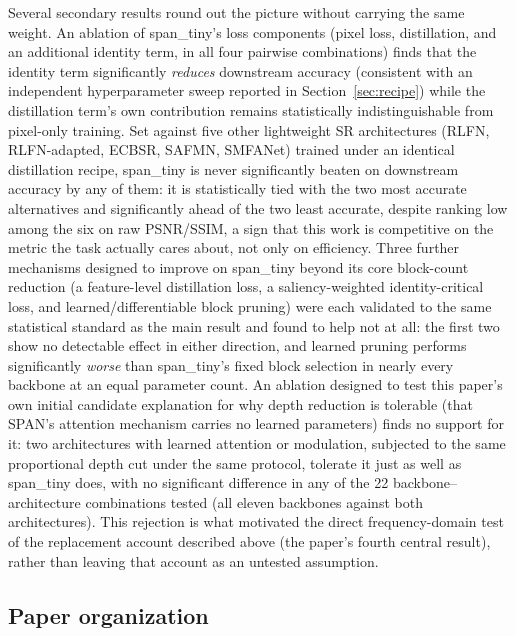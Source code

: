 \documentclass[11pt]{article}
\begin{document}
Several secondary results round out the picture without carrying the same weight. An ablation of span\_tiny's loss components (pixel loss, distillation, and an additional identity term, in all four pairwise combinations) finds that the identity term significantly \emph{reduces} downstream accuracy (consistent with an independent hyperparameter sweep reported in Section~\ref{sec:recipe}) while the distillation term's own contribution remains statistically indistinguishable from pixel-only training. Set against five other lightweight SR architectures (RLFN, RLFN-adapted, ECBSR, SAFMN, SMFANet) trained under an identical distillation recipe, span\_tiny is never significantly beaten on downstream accuracy by any of them: it is statistically tied with the two most accurate alternatives and significantly ahead of the two least accurate, despite ranking low among the six on raw PSNR/SSIM, a sign that this work is competitive on the metric the task actually cares about, not only on efficiency. Three further mechanisms designed to improve on span\_tiny beyond its core block-count reduction (a feature-level distillation loss, a saliency-weighted identity-critical loss, and learned/differentiable block pruning) were each validated to the same statistical standard as the main result and found to help not at all: the first two show no detectable effect in either direction, and learned pruning performs significantly \emph{worse} than span\_tiny's fixed block selection in nearly every backbone at an equal parameter count. An ablation designed to test this paper's own initial candidate explanation for why depth reduction is tolerable (that SPAN's attention mechanism carries no learned parameters) finds no support for it: two architectures with learned attention or modulation, subjected to the same proportional depth cut under the same protocol, tolerate it just as well as span\_tiny does, with no significant difference in any of the 22 backbone--architecture combinations tested (all eleven backbones against both architectures). This rejection is what motivated the direct frequency-domain test of the replacement account described above (the paper's fourth central result), rather than leaving that account as an untested assumption.

\subsection{Paper organization}
\end{document}
